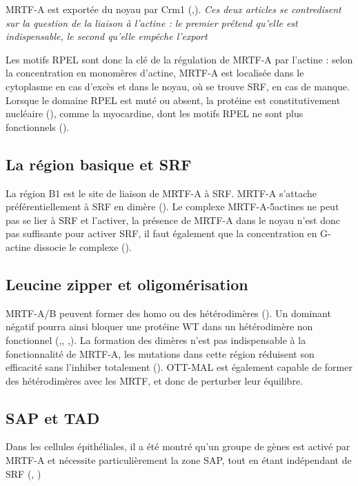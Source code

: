 \documentclass{report}
\begin{document}
 MRTF-A est exportée du noyau par Crm1 (\cite{vartiainen_nuclear_2007},\cite{hayashi_differences_2013}). \emph{Ces deux articles se contredisent sur la question de la liaison à l'actine : le premier prétend qu'elle est indispensable, le second qu'elle empêche l'export} 
 
 Les motifs RPEL sont donc la clé de la régulation de MRTF-A par l'actine : selon la concentration en monomères d'actine, MRTF-A est localisée dans le cytoplasme en cas d'excès et dans le noyau, où se trouve SRF, en cas de manque. Lorsque le domaine RPEL est muté ou absent, la protéine est constitutivement nucléaire (\cite{miralles_actin_2003}), comme la myocardine, dont les motifs RPEL ne sont plus fonctionnels (\cite{guettler_rpel_2008}). 
 
 \subsection{La région basique et SRF}
 La région B1 est le site de liaison de MRTF-A à SRF. MRTF-A s'attache préférentiellement à SRF en dimère (\cite{miralles_actin_2003}). Le complexe MRTF-A-5actines ne peut pas se lier à SRF et l'activer, la présence de MRTF-A dans le noyau n'est donc pas suffisante pour activer SRF, il faut également que la concentration en G-actine dissocie le complexe (\cite{vartiainen_nuclear_2007}). 
 \subsection{Leucine zipper et oligomérisation}
 MRTF-A/B peuvent former des homo ou des hétérodimères (\cite{miralles_actin_2003}). Un dominant négatif pourra ainsi bloquer une protéine WT dans un hétérodimère non fonctionnel (\cite{selvaraj_megakaryoblastic_2003},\cite{cen_myocardin/mkl_2004}, \cite{li_requirement_2005},\cite{rajakyla_actin-regulated_2010}). La formation des dimères n'est pas indispensable à la fonctionnalité de MRTF-A, les mutations dans cette région réduisent son efficacité sans l'inhiber totalement (\cite{selvaraj_megakaryoblastic_2003}). 
 OTT-MAL est également capable de former des hétérodimères avec les MRTF, et donc de perturber leur équilibre. 
 
 \subsection{SAP et TAD}
 
Dans les cellules épithéliales, il a été montré qu'un groupe de gènes est activé par MRTF-A et nécessite particulièrement la zone SAP, tout en étant indépendant de SRF (\cite{asparuhova_transcriptional_2011}, \cite{gurbuz_sap_2014}) 
 
\end{document}
